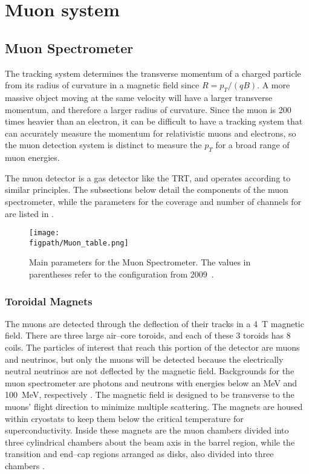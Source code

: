\section{Muon system}

\subsection{Muon Spectrometer}

The tracking system determines the transverse momentum of a charged particle from its radius of curvature in a magnetic field since $R = p_T /(qB)$.  A more massive object moving at the same velocity will have a larger transverse momentum, and therefore a larger radius of curvature.  Since the muon is 200 times heavier than an electron, it can be difficult to have a tracking system that can accurately measure the momentum for relativistic muons and electrons, so the muon detection system is distinct to measure the $p_T$ for a broad range of muon energies.  

The muon detector is a gas detector like the TRT, and operates according to similar principles. 
The subsections below detail the components of the muon spectrometer, while the parameters for the coverage and number of channels for are listed in .

\begin{figure}[h!tbp]
\centering
\texttt{[image: \\figpath/Muon\_table.png]}
\caption{Main parameters for the Muon Spectrometer.  The values in parentheses refer to the configuration from 2009~\cite{ATLAS_long}.}
\label{Muon-table}
\end{figure}

\subsubsection{Toroidal Magnets}

The muons are detected through the deflection of their tracks in a 4~T magnetic field.  There are three large air--core toroids, and each of these 3 toroids has 8 coils.  
The particles of interest that reach this portion of the detector are muons and neutrinos, but only the muons will be detected because the electrically neutral neutrinos are not deflected by the magnetic field.  
Backgrounds for the muon spectrometer are photons and neutrons with energies below an MeV and 100~MeV, respectively \cite{ATLAS_long}.  
The magnetic field is designed to be transverse to the muons' flight direction to minimize multiple scattering. The magnets are housed within cryostats to keep them below the critical temperature for superconductivity.  Inside these magnets are the muon chambers divided into three cylindrical chambers about the beam axis in the barrel region, while the transition and end--cap regions arranged as disks, also divided into three chambers \cite{ATLAS_long}.

